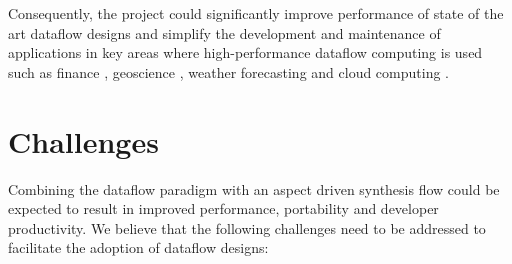 Consequently, the project could significantly improve performance of
state of the art dataflow designs and simplify the development and
maintenance of applications in key areas where high-performance
dataflow computing is used such as finance \cite{6339256,
  Weston:Martin:Spooner:Pell:Mencer:2010}, geoscience \cite{6226384},
weather forecasting \cite{Oriato:Tilbury:Marrocu:Pusceddu:2012} and
cloud computing \cite{710029}.

\section{Challenges}

Combining the dataflow paradigm with an aspect driven synthesis
flow could be expected to result in improved performance, portability
and developer productivity.  We believe that the following challenges
need to be addressed to facilitate the adoption of dataflow designs:

